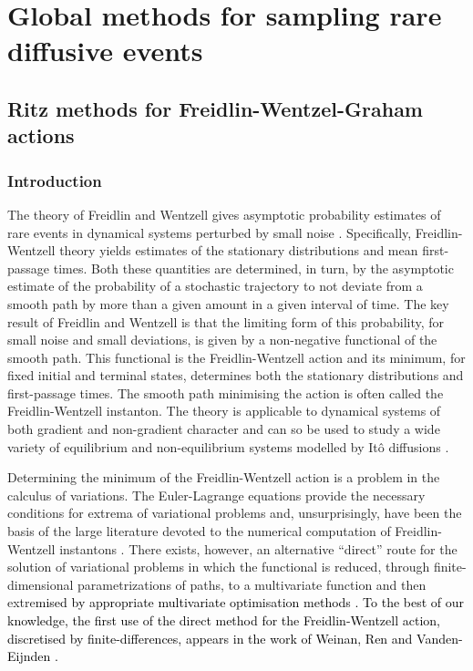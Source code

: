 \part{Global methods for sampling rare diffusive events}

\chapter{Ritz methods for Freidlin-Wentzel-Graham actions} \label{ch:Ritz methods for Freidlin-Wentzel-Graham actions}

\section{Introduction}

The theory of Freidlin and Wentzell \citep{ventselSMALLRANDOMPERTURBATIONS1970}
gives asymptotic probability estimates of rare events in dynamical
systems perturbed by small noise \citep{bolhuis2002transition, allen2005sampling, allen2009forward, ebener2019instanton}.
Specifically, Freidlin-Wentzell theory yields estimates of the stationary
distributions and mean first-passage times. Both these quantities
are determined, in turn, by the asymptotic estimate of the probability
of a stochastic trajectory to not deviate from a smooth path by more
than a given amount in a given interval of time. The key result of
Freidlin and Wentzell is that the limiting form of this probability,
for small noise and small deviations, is given by a non-negative functional
of the smooth path. This functional is the Freidlin-Wentzell action
and its minimum, for fixed initial and terminal states, determines
both the stationary distributions and first-passage times. The smooth
path minimising the action is often called the Freidlin-Wentzell instanton.
The theory is applicable to dynamical systems of both gradient and
non-gradient character and can so be used to study a wide variety
of equilibrium and non-equilibrium systems modelled by Itô diffusions
\citep{paninski2006most,huang2012molecular, bouchet2016generalisation, maier1996scaling, wolynes1995navigating, noltingBallsCupsQuasipotentials2016, mangel1994barrier, gardner2000construction, demarco2001phase, nelson1987stochastic}.

Determining the minimum of the Freidlin-Wentzell action is a problem
in the calculus of variations. The Euler-Lagrange equations provide
the necessary conditions for extrema of variational problems and,
unsurprisingly, have been the basis of the large literature devoted
to the numerical computation of Freidlin-Wentzell instantons \citep{weinan2002string,paninski2006most,heymann2008geometric,grafke2017long}.
There exists, however, an alternative ``direct'' route for the solution
of variational problems in which the functional is reduced, through
finite-dimensional parametrizations of paths, to a multivariate function
and then extre\textcolor{black}{mised by appropriate multivariate
optimisation methods \citep{gelfand2012calculus,kantorovich1958approximate}.
To the best of our knowledge, the first use of the direct method for
the Freidlin-Wentzell action, discretised by finite-differences, appears
in the work of Weinan, Ren and Vanden-Eijnden \citep{weinan2004minimum}.} 

